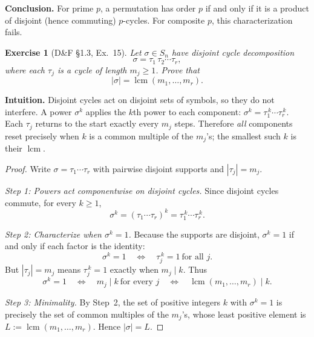 \documentclass[12pt]{article}
\newtheorem{exercise}[theorem]{Exercise}
\theoremstyle{definition}
\begin{document}
\textbf{Conclusion.} For prime $p$, a permutation has order $p$ if and only if it is a product of disjoint (hence commuting) $p$-cycles.
For composite $p$, this characterization fails.


\newpage

\begin{exercise}[D\&F §1.3, Ex.~15]
Let $\sigma\in S_n$ have disjoint cycle decomposition
\[
\sigma=\tau_1\,\tau_2\cdots \tau_r,
\]
where each $\tau_j$ is a cycle of length $m_j\ge 1$. Prove that
\[
|\sigma|=\operatorname{lcm}(m_1,\dots,m_r).
\]
\end{exercise}

\dotfill

\noindent\textbf{Intuition.}
Disjoint cycles act on disjoint sets of symbols, so they do not interfere.  
A power $\sigma^{k}$ applies the $k$th power to each component: $\sigma^{k}=\tau_1^{\,k}\cdots\tau_r^{\,k}$.  
Each $\tau_j$ returns to the start exactly every $m_j$ steps. Therefore \emph{all} components reset
precisely when $k$ is a common multiple of the $m_j$’s; the smallest such $k$ is their $\operatorname{lcm}$.

\dotfill

\begin{proof}
Write $\sigma=\tau_1\cdots\tau_r$ with pairwise disjoint supports and $|\tau_j|=m_j$.

\smallskip

\noindent\emph{Step 1: Powers act componentwise on disjoint cycles.}
Since disjoint cycles commute, for every $k\ge 1$,
\[
\sigma^{k}=(\tau_1\cdots\tau_r)^{k}=\tau_1^{\,k}\cdots\tau_r^{\,k}.
\]

\smallskip

\noindent\emph{Step 2: Characterize when $\sigma^{k}=1$.}
Because the supports are disjoint, $\sigma^{k}=1$ if and only if each factor is the identity:
\[
\sigma^{k}=1\quad\Longleftrightarrow\quad \tau_j^{\,k}=1\ \text{for all }j.
\]
But $|\tau_j|=m_j$ means $\tau_j^{\,k}=1$ exactly when $m_j\mid k$.
Thus
\[
\sigma^{k}=1\quad\Longleftrightarrow\quad m_j\mid k\ \text{for every }j
\quad\Longleftrightarrow\quad \operatorname{lcm}(m_1,\dots,m_r)\mid k.
\]

\smallskip

\noindent\emph{Step 3: Minimality.}
By Step~2, the set of positive integers $k$ with $\sigma^k=1$ is precisely the set of common multiples
of the $m_j$’s, whose least positive element is $L:=\operatorname{lcm}(m_1,\dots,m_r)$.
Hence $|\sigma|=L$.
\end{proof}
\end{document}
